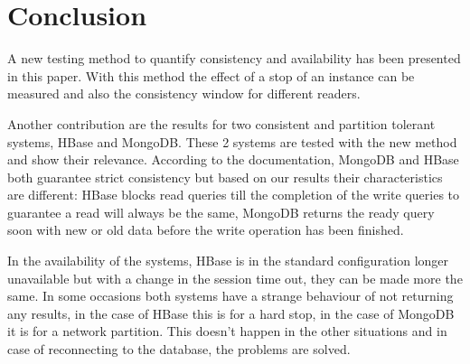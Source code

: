 \documentclass[10pt,conference,letterpaper]{IEEEtran}
\begin{document}
\section{Conclusion}\label{sec:conclusion}
A new testing method to quantify consistency and availability has been presented in this paper. With this method the effect of a stop of an instance can be measured and also the consistency window for different readers. 

Another contribution are the results for two consistent and partition tolerant systems, HBase and MongoDB. These 2 systems are tested with the new method and show their relevance. According to the documentation, MongoDB and HBase both guarantee strict consistency but based on our results their characteristics are different: HBase blocks read queries till the completion of the write queries to guarantee a read will always be the same, MongoDB returns the ready query soon with new or old data before the write operation has been finished. 

In the availability of the systems, HBase is in the standard configuration longer unavailable but with a change in the session time out, they can be made more the same. In some occasions both systems have a strange behaviour of not returning any results, in the case of HBase this is for a hard stop, in the case of MongoDB it is for a network partition. This doesn't happen in the other situations and in case of reconnecting to the database, the problems are solved. 











\end{document}
